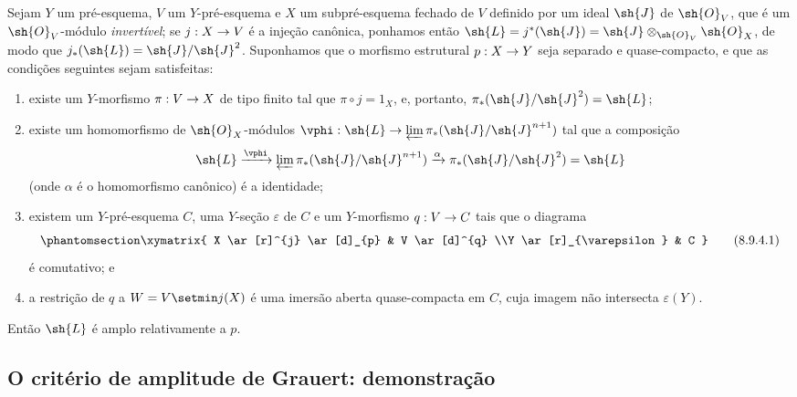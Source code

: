 \documentclass[oneside,10pt]{amsart}
\makeatletter
\newcommand{\ega@arrow}[2]{\mathchoice{#1}{#2}{#2}{#2}}
\renewcommand{\to}{\ega@arrow{\longrightarrow}{\rightarrow}}
\newcommand{\oldpage}[2][]{\marginnote{\normalfont\footnotesize\textbf{#1}~|~#2}\ignorespaces}
\let\EGAOriginalLabel\label
\renewcommand{\label}[1]{\phantomsection\EGAOriginalLabel{#1}}
\makeatother
\begin{document}
\begin{proposition}[8.9.4]
\label{II.8.9.4}
Sejam $Y$ um pré-esquema, $V$ um $Y$-pré-esquema e $X$ um subpré-esquema fechado de $V$ definido por um ideal $\sh{J}$ de $\sh{O}_V$, que é um $\sh{O}_V$-módulo \emph{invertível};
se $j:X\to V$ é
\oldpage[II]{184}
a injeção canônica, ponhamos então $\sh{L} = j^*(\sh{J}) = \sh{J}\otimes_{\sh{O}_V}\sh{O}_X$, de modo que $j_*(\sh{L})=\sh{J}/\sh{J}^2$.
Suponhamos que o morfismo estrutural $p:X\to Y$ seja separado e quase-compacto, e que as condições seguintes sejam satisfeitas:
\begin{enumerate}
  \item[\rm{(i)}] existe um $Y$-morfismo $\pi:V\to X$ de tipo finito tal que $\pi\circ j=1_X$, e, portanto, $\pi_*(\sh{J}/\sh{J}^2)=\sh{L}$;
  \item[\rm{(ii)}] existe um homomorfismo de $\sh{O}_X$-módulos $\vphi:\sh{L}\to\varprojlim\pi_*(\sh{J}/\sh{J}^{n+1})$ tal que a composição
    \[
      \sh{L}
      \xrightarrow{\vphi}
      \varprojlim \pi_*(\sh{J}/\sh{J}^{n+1})
      \xrightarrow{\alpha}
      \pi_*(\sh{J}/\sh{J}^2) = \sh{L}
    \]
    (onde $\alpha$ é o homomorfismo canônico) é a identidade;
  \item[\rm{(iii)}] existem um $Y$-pré-esquema $C$, uma $Y$-seção $\varepsilon$ de $C$ e um $Y$-morfismo $q:V\to C$ tais que o diagrama
    \[
    \label{II.8.9.4.1}
      \xymatrix{
        X
          \ar[r]^{j}
          \ar[d]_{p}
      & V
          \ar[d]^{q}
      \\Y
          \ar[r]_{\varepsilon}
      & C
      }
    \tag{8.9.4.1}
    \]
    é comutativo; e
  \item[\rm{(iv)}] a restrição de $q$ a $W=V\setmin j(X)$ é uma imersão aberta quase-compacta em $C$, cuja imagem não intersecta $\varepsilon(Y)$.
\end{enumerate}
Então $\sh{L}$ é amplo relativamente a $p$.
\end{proposition}


\subsection{O critério de amplitude de Grauert: demonstração}
\label{subsection:II.8.10}
\end{document}
